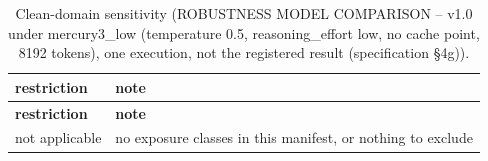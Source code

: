 \begingroup\footnotesize
\begin{longtable}{>{\raggedright\arraybackslash}p{126.4pt}>{\raggedright\arraybackslash}p{304.6pt}}
\caption{Clean-domain sensitivity (ROBUSTNESS MODEL COMPARISON -- v1.0 under mercury3\_\allowbreak{}low (temperature 0.5, reasoning\_\allowbreak{}effort low, no cache point, 8192 tokens), one execution, not the registered result (specification §4g)).} \\
\toprule
\textbf{restriction} & \textbf{note} \\
\midrule
\endfirsthead
\toprule
\textbf{restriction} & \textbf{note} \\
\midrule
\endhead
\bottomrule
\endfoot
not applicable & no exposure classes in this manifest, or nothing to exclude \\
\end{longtable}
\endgroup

